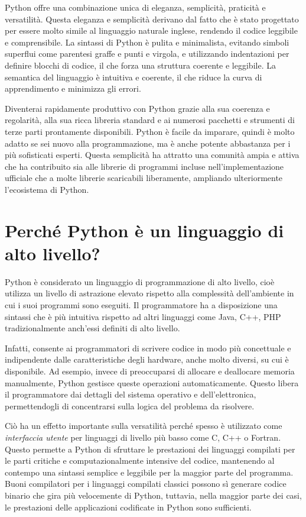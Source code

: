 \documentclass[
  letterpaper,
]{scrbook}
\begin{document}
Python offre una combinazione unica di eleganza, semplicità, praticità e
versatilità. Questa eleganza e semplicità derivano dal fatto che è stato
progettato per essere molto simile al linguaggio naturale inglese,
rendendo il codice leggibile e comprensibile. La sintassi di Python è
pulita e minimalista, evitando simboli superflui come parentesi graffe e
punti e virgola, e utilizzando indentazioni per definire blocchi di
codice, il che forza una struttura coerente e leggibile. La semantica
del linguaggio è intuitiva e coerente, il che riduce la curva di
apprendimento e minimizza gli errori.

Diventerai rapidamente produttivo con Python grazie alla sua coerenza e
regolarità, alla sua ricca libreria standard e ai numerosi pacchetti e
strumenti di terze parti prontamente disponibili. Python è facile da
imparare, quindi è molto adatto se sei nuovo alla programmazione, ma è
anche potente abbastanza per i più sofisticati esperti. Questa
semplicità ha attratto una comunità ampia e attiva che ha contribuito
sia alle librerie di programmi incluse nell'implementazione ufficiale
che a molte librerie scaricabili liberamente, ampliando ulteriormente
l'ecosistema di Python.

\section{Perché Python è un linguaggio di alto
livello?}\label{perchuxe9-python-uxe8-un-linguaggio-di-alto-livello}

Python è considerato un linguaggio di programmazione di alto livello,
cioè utilizza un livello di astrazione elevato rispetto alla complessità
dell'ambiente in cui i suoi programmi sono eseguiti. Il programmatore ha
a disposizione una sintassi che è più intuitiva rispetto ad altri
linguaggi come Java, C++, PHP tradizionalmente anch'essi definiti di
alto livello.

Infatti, consente ai programmatori di scrivere codice in modo più
concettuale e indipendente dalle caratteristiche degli hardware, anche
molto diversi, su cui è disponibile. Ad esempio, invece di preoccuparsi
di allocare e deallocare memoria manualmente, Python gestisce queste
operazioni automaticamente. Questo libera il programmatore dai dettagli
del sistema operativo e dell'elettronica, permettendogli di concentrarsi
sulla logica del problema da risolvere.

Ciò ha un effetto importante sulla versatilità perché spesso è
utilizzato come \emph{interfaccia utente} per linguaggi di livello più
basso come C, C++ o Fortran. Questo permette a Python di sfruttare le
prestazioni dei linguaggi compilati per le parti critiche e
computazionalmente intensive del codice, mantenendo al contempo una
sintassi semplice e leggibile per la maggior parte del programma. Buoni
compilatori per i linguaggi compilati classici possono sì generare
codice binario che gira più velocemente di Python, tuttavia, nella
maggior parte dei casi, le prestazioni delle applicazioni codificate in
Python sono sufficienti.
\end{document}
